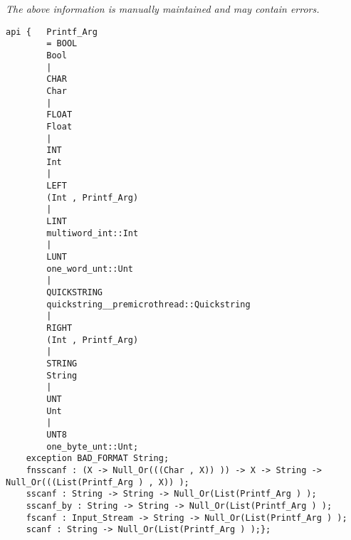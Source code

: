 \label{api:Scanf}

{\tiny \it The above information is manually maintained and may contain errors.}
\begin{verbatim}
api {   Printf_Arg
        = BOOL
        Bool
        |
        CHAR
        Char
        |
        FLOAT
        Float
        |
        INT
        Int
        |
        LEFT
        (Int , Printf_Arg)
        |
        LINT
        multiword_int::Int
        |
        LUNT
        one_word_unt::Unt
        |
        QUICKSTRING
        quickstring__premicrothread::Quickstring
        |
        RIGHT
        (Int , Printf_Arg)
        |
        STRING
        String
        |
        UNT
        Unt
        |
        UNT8
        one_byte_unt::Unt;
    exception BAD_FORMAT String;
    fnsscanf : (X -> Null_Or(((Char , X)) )) -> X -> String -> Null_Or(((List(Printf_Arg ) , X)) );
    sscanf : String -> String -> Null_Or(List(Printf_Arg ) );
    sscanf_by : String -> String -> Null_Or(List(Printf_Arg ) );
    fscanf : Input_Stream -> String -> Null_Or(List(Printf_Arg ) );
    scanf : String -> Null_Or(List(Printf_Arg ) );};
\end{verbatim}
